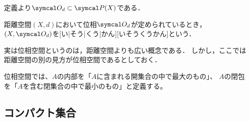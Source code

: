 \documentclass[../sotsu.tex]{subfiles}
\begin{document}
定義より$\topology_d \subset \pset(X)$である．

\begin{definition}
    \label{dfn:topological-space}
    距離空間$(X, d)$において位相$\topology_d$が定められているとき，
    $(X, \topology_d)$を[い|そう|くう|かん][いそうくうかん]という．
\end{definition}

実は位相空間というのは，距離空間よりも広い概念である．
しかし，ここでは距離空間の別の見方が位相空間であるとしておく．

位相空間では、$A$の内部を「$A$に含まれる開集合の中で最大のもの」、
$A$の閉包を「$A$を含む閉集合の中で最小のもの」と定義する。



\subsection{コンパクト集合}





\end{document}
